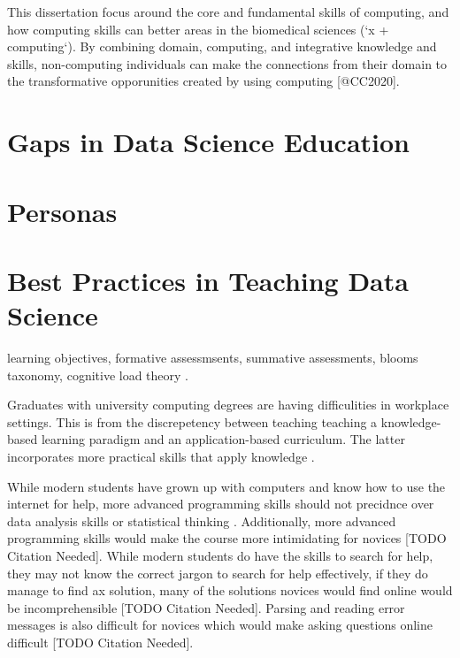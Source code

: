 \documentclass[../main.tex]{subfiles}
\begin{document}
        This dissertation focus around the core and fundamental skills
        of computing, and how computing skills can better areas in the biomedical sciences (`x + computing`).
        By combining domain, computing, and integrative knowledge and skills,
        non-computing individuals can make the connections from their domain to the transformative opporunities
        created by using computing [@CC2020].

    \section{Gaps in Data Science Education}

    \section{Personas}
        \label{se:intro-personas}

        

    \section{Best Practices in Teaching Data Science}

        learning objectives, formative assessmsents, summative assessments, blooms taxonomy,
        cognitive load theory
        \cite{DonaldClarkPlan2020}.

        Graduates with university computing degrees are having difficulities in workplace settings.
        This is from the discrepetency between teaching teaching a knowledge-based learning paradigm and an application-based curriculum.
        The latter incorporates more practical skills that apply knowledge
        \cite{cc2005}.

        While modern students have grown up with computers and know how to use the internet for help,
        more advanced programming skills should not precidnce over data analysis skills or statistical thinking
        \cite{gaise2016}.
        Additionally, more advanced programming skills would make the course more intimidating for novices [TODO Citation Needed].
        While modern students do have the skills to search for help,
        they may not know the correct jargon to search for help effectively,
        if they do manage to find ax solution,
        many of the solutions novices would find online would be incomprehensible [TODO Citation Needed].
        Parsing and reading error messages is also difficult for novices which would make asking questions online difficult [TODO Citation Needed].
\end{document}
